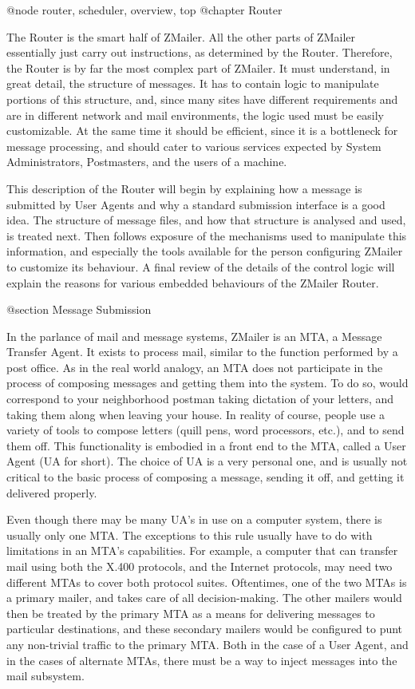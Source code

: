 @node router, scheduler, overview, top
@chapter Router

The Router is the smart half of ZMailer.
All the other parts of ZMailer essentially just carry out
instructions, as determined by the Router.
Therefore, the Router is by far the most complex part of ZMailer.
It must understand, in great detail, the structure of messages.
It has to contain logic to manipulate portions of this structure,
and, since many sites have different requirements and are in
different network and mail environments, the logic used must be
easily customizable.
At the same time it should be efficient, since it is a bottleneck
for message processing, and should cater to various services expected
by System Administrators, Postmasters, and the users of a machine.

This description of the Router will begin by explaining how
a message is submitted by User Agents and why a standard
submission interface is a good idea.
The structure of message files, and how that structure is
analysed and used, is treated next.
Then follows exposure of the mechanisms used to manipulate
this information, and especially the tools available for the
person configuring ZMailer to customize its behaviour.
A final review of the details of the control logic will explain
the reasons for various embedded behaviours of the ZMailer Router.

@section Message Submission

In the parlance of mail and message systems, ZMailer is an MTA,
a Message Transfer Agent.
It exists to process mail, similar to the function performed by
a post office.
As in the real world analogy, an MTA does not participate in
the process of composing messages and getting them into the system.
To do so, would correspond to your neighborhood postman taking
dictation of your letters, and taking them along when leaving
your house.
In reality of course, people use a variety of tools to compose
letters (quill pens, word processors, etc.), and to send them off.
This functionality is embodied in a front end to the MTA, called
a User Agent (UA for short).
The choice of UA is a very personal one, and is usually not critical
to the basic process of composing a message, sending it off, and
getting it delivered properly.

Even though there may be many UA's in use on a computer system,
there is usually only one MTA.
The exceptions to this rule usually have to do with limitations
in an MTA's capabilities.
For example, a computer that can transfer mail using both
the X.400 protocols, and the Internet protocols, may need
two different MTAs to cover both protocol suites.
Oftentimes, one of the two MTAs is a primary mailer, and
takes care of all decision-making.
The other mailers would then be treated by the primary MTA
as a means for delivering messages to particular destinations,
and these secondary mailers would be configured to punt any
non-trivial traffic to the primary MTA.
Both in the case of a User Agent, and in the cases of alternate
MTAs, there must be a way to inject messages into the mail subsystem.

